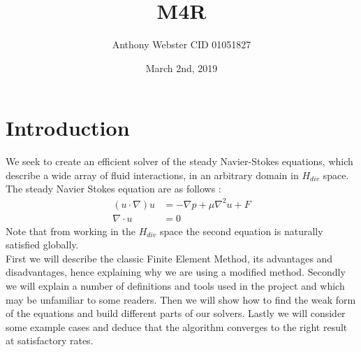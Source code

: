 \documentclass[11pt,twoside,a4paper]{article}
\begin{document}
\setcounter{secnumdepth}{4}
\title{M4R}
\date{March 2nd, 2019}
\author{Anthony Webster CID 01051827}
\maketitle
\section{Introduction}
We seek to create an efficient solver of the steady Navier-Stokes equations, which describe a wide array of fluid interactions, in an arbitrary domain in $H_{div}$ space. The steady Navier Stokes equation are as follows :
\begin{align}
(u \cdot \nabla) u &= -\nabla p + \mu \nabla^2 u + F \\
\nabla \cdot u &= 0
\end{align}
Note that from working in the $H_{div}$ space the second equation is naturally satisfied globally.
\\
First we will describe the classic Finite Element Method, its advantages and disadvantages, hence explaining why we are using a modified method. Secondly we will explain a number of definitions and tools used in the project and which may be unfamiliar to some readers. Then we will show how to find the weak form of the equations and build different parts of our solvers. Lastly we will consider some example cases and deduce that the algorithm converges to the right result at satisfactory rates.\\
\end{document}
